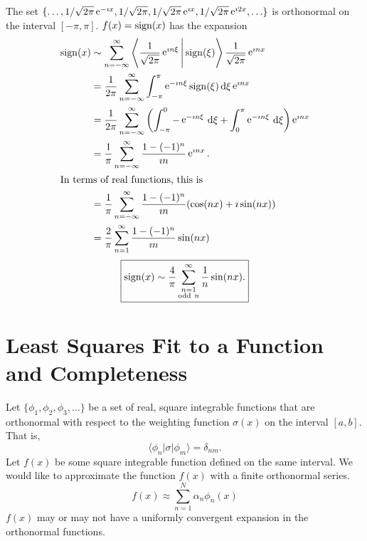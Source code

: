 \begin{Example}
  The set $\{ \ldots, 1/\sqrt{2\pi} \mathop{\mathrm{e}}\nolimits^{-\imath x}, 1/\sqrt{2\pi}, 
  1/\sqrt{2\pi} \mathop{\mathrm{e}}\nolimits^{\imath x}, 1/\sqrt{2\pi} \mathop{\mathrm{e}}\nolimits^{\imath 2 x}, \ldots\}$ is orthonormal
  on the interval $[-\pi,\pi]$.  $f(x) = \mathop{\mathrm{sign}}\nolimits(x)$ has the
  expansion
  \begin{align*}
    \mathop{\mathrm{sign}}\nolimits(x) 
    &\sim \sum_{n = -\infty}^\infty \left\langle \frac{1}{\sqrt{2\pi}} \mathop{\mathrm{e}}\nolimits^{\imath n \xi} \Bigg| \mathop{\mathrm{sign}}\nolimits(\xi) \right\rangle
    \frac{1}{\sqrt{2\pi}} \mathop{\mathrm{e}}\nolimits^{\imath n x} \\
    &= \frac{1}{2\pi} \sum_{n = -\infty}^\infty \int_{-\pi}^\pi \mathop{\mathrm{e}}\nolimits^{-\imath n \xi} \mathop{\mathrm{sign}}\nolimits(\xi)
    \,\mathrm{d} \xi \mathop{\mathrm{e}}\nolimits^{\imath n x} \\
    &= \frac{1}{2\pi} \sum_{n = -\infty}^\infty \left( \int_{-\pi}^0 - \mathop{\mathrm{e}}\nolimits^{-\imath n \xi}\,\mathrm{d} \xi
      + \int_0^\pi \mathop{\mathrm{e}}\nolimits^{-\imath n \xi}\,\mathrm{d} \xi \right)
    \mathop{\mathrm{e}}\nolimits^{\imath n x} \\
    &= \frac{1}{\pi} \sum_{n = -\infty}^\infty \frac{1 - (-1)^n}{\imath n} \mathop{\mathrm{e}}\nolimits^{\imath n x}. \\
    \intertext{In terms of real functions, this is}
    &= \frac{1}{\pi} \sum_{n = -\infty}^\infty \frac{1 - (-1)^n}{\imath n} 
    (\cos(n x) + \imath \sin(n x)) \\
    &= \frac{2}{\pi} \sum_{n = 1}^\infty \frac{1 - (-1)^n}{\imath n} \sin(n x) 
  \end{align*}
  \[ \boxed{ \sign(x) \sim \frac{4}{\pi} \sum_{\substack{ {n} = 1 \\ \mathrm{odd}\ n}}^{\infty} 
    \frac{1}{n} \sin(n x).} \]
\end{Example}







\section{Least Squares Fit to a Function and Completeness}

Let $\{\phi_1, \phi_2, \phi_3, \ldots \}$ be a set of real, square integrable
functions that are orthonormal with respect to the weighting function
$\sigma(x)$ on the interval $[a, b]$.  That is,
\[ \langle \phi_n | \sigma | \phi_m \rangle = \delta_{nm}. \]
Let $f(x)$ be some square integrable function defined on the same interval.
We would like to approximate the function $f(x)$ with a finite
orthonormal series.
\[ 
f(x) \approx \sum_{n=1}^N \alpha_n \phi_n(x) 
\]
$f(x)$ may or may not have a uniformly convergent expansion in the orthonormal
functions.

